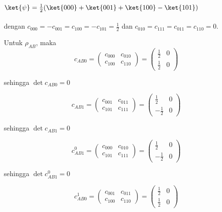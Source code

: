 \subsection{ $\ket{\psi}=\frac{1}{2}(\ket{000}+\ket{001}+\ket{100}-\ket{101})$}
dengan $c_{000}=-c_{001}=c_{100}=-c_{101}=\frac{1}{2}$ dan $c_{010}=c_{111}=c_{011}=c_{110}=0$.

Untuk $\rho_{AB}$, maka
\begin{equation}
	c_{AB0}=
	\begin{pmatrix}
		c_{000} & c_{010} \\
		c_{100} & c_{110}
	\end{pmatrix}=
	\begin{pmatrix}
		\frac{1}{2} & 0 \\
		\frac{1}{2} & 0
	\end{pmatrix}
\end{equation}

sehingga $\det c_{AB0} = 0$

\begin{equation}
	c_{AB1}=
	\begin{pmatrix}
		c_{001} & c_{011} \\
		c_{101} & c_{111}
	\end{pmatrix}=
	\begin{pmatrix}
		\frac{1}{2} & 0 \\
		-\frac{1}{2} & 0
	\end{pmatrix}
\end{equation}

sehingga $\det c_{AB1} = 0$

\begin{equation}
	c_{AB1}^0=
	\begin{pmatrix}
		c_{000} & c_{010} \\
		c_{101} & c_{111}
	\end{pmatrix}=
	\begin{pmatrix}
		\frac{1}{2} & 0 \\
		-\frac{1}{2} & 0
	\end{pmatrix}
\end{equation}

sehingga $\det c_{AB1}^0 = 0$

\begin{equation}
	c_{AB0}^1=
	\begin{pmatrix}
		c_{001} & c_{011} \\
		c_{100} & c_{110}
	\end{pmatrix}=
	\begin{pmatrix}
		\frac{1}{2} & 0 \\
		\frac{1}{2} & 0
	\end{pmatrix}
\end{equation}

